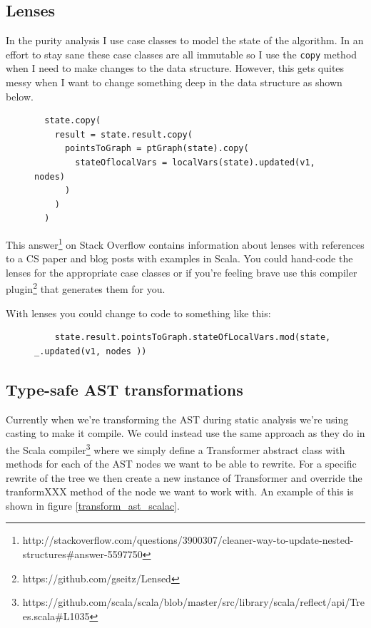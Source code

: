 \documentclass[11pt]{exam}
\begin{document}
\subsection{Lenses}

In the purity analysis I use case classes to model the state of the algorithm. In an effort to stay sane these case classes are all immutable so I use the \texttt{copy} method when I need to make changes to the data structure. However, this gets quites messy when I want to change something deep in the data structure as shown below.

\begin{figure}[h!]
  \begin{lstlisting}
  state.copy(
    result = state.result.copy(
      pointsToGraph = ptGraph(state).copy(
        stateOflocalVars = localVars(state).updated(v1, nodes)
      )
    )
  )
  \end{lstlisting}
\end{figure}

This answer\footnote{http://stackoverflow.com/questions/3900307/cleaner-way-to-update-nested-structures\#answer-5597750} on Stack Overflow contains information about lenses with references to a CS paper and blog posts with examples in Scala. You could hand-code the lenses for the appropriate case classes or if you're feeling brave use this compiler plugin\footnote{https://github.com/gseitz/Lensed} that generates them for you. \newline

With lenses you could change to code to something like this:

\begin{figure}[h!]
  \begin{lstlisting}
    state.result.pointsToGraph.stateOfLocalVars.mod(state, _.updated(v1, nodes ))
  \end{lstlisting}
\end{figure}

\subsection{Type-safe AST transformations}

Currently when we're transforming the AST during static analysis we're using casting to make it compile. We could instead use the same approach as they do in the Scala compiler\footnote{https://github.com/scala/scala/blob/master/src/library/scala/reflect/api/Trees.scala\#L1035} where we simply define a Transformer abstract class with methods for each of the AST nodes we want to be able to rewrite. For a specific rewrite of the tree we then create a new instance of Transformer and override the tranformXXX method of the node we want to work with. An example of this is shown in figure \ref{transform_ast_scalac}.
\end{document}
